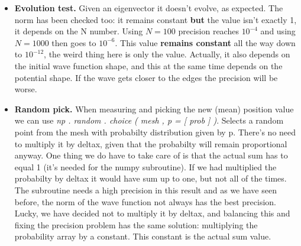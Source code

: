 \documentclass{article}
\begin{document}
\begin{itemize}
\[\begin{pmatrix}
	\end{pmatrix}
	= \psi(x,t)
	\]
	The first matrix is the one we get from eigenparam, \textit{evect}, so we only need to build the second one and then doing the product.
	\begin{itemize}
		\item \textbf{Time evolution matrix:} when measuring, from the three factors in the time evolution expression, only the components change. So building a matrix with the exponential factor and the eigenvectors, and then a component vector, the time evolution would become much easier: just multipling the matrix with the components, regardless if measures are made, we will not have to build any matrix (components come from \textit{comp}). To do so we have to find a way of building this first matrix considering the parameter time has to go inside, \textbf{without having to build the matrix itself again} (transposing and all, just giving the time value). Defining a function with parameter time to build this matrix would be pointless since we are going to call this function inside the loop and the point is to have the matrix ready before the loop starts, in order to make the computation easier \footnote{This is just a thought, maybe it's not that important (timewise) to build this matrix (transpose and all perhaps doesn't take that much time to do).}.
	\end{itemize}

	\item \textbf{Evolution test.} Given an eigenvector it doesn't evolve, as expected. The norm has been checked too: it remains constant \textbf{but} the value isn't exactly 1, it depends on the N number. Using $N = 100$ precision reaches $10^{-4}$ and using $N = 1000$ then goes to $10^{-6}$. This value \textbf{remains constant} all the way down to $10^{-12}$, the weird thing here is only the value. Actually, it also depends on the initial wave function shape, and this at the same time depends on the potential shape. If the wave gets closer to the edges the precision will be worse.

	\item \textbf{Random pick.} When measuring and picking the new (mean) position  value we can use \textit{np . random . choice ( mesh , p = [ prob ] )}. Selects a random point from the mesh with probabilty distribution given by p. There's no need to multiply it by deltax, given that the probabilty will remain proportional anyway. One thing we do have to take care of is that the actual sum has to equal 1 (it's needed for the numpy subroutine). If we had multiplied the probabilty by deltax it would have sum up to one, but not all of the times. The subroutine needs a high precision in this result and as we have seen before, the norm of the wave function not always has the best precision. Lucky, we have decided not to multiply it by deltax, and balancing this and fixing the precision problem has the same  solution: multiplying the probability array by a constant. This constant is the actual sum value.
	

\end{itemize}
\end{document}
